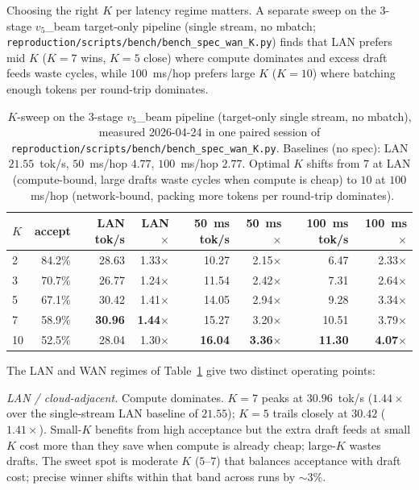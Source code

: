\documentclass[11pt]{article}
\newcommand{\brk}{\discretionary{}{}{}}
\begin{document}
Choosing the right $K$ per latency regime matters. A separate sweep on the 3-stage $v_5$\_beam target-only pipeline (single stream, no mbatch; \texttt{reproduction/\brk scripts/\brk bench/\brk bench\_\brk spec\_\brk wan\_\brk K.py}) finds that LAN prefers mid $K$ ($K\!=\!7$ wins, $K\!=\!5$ close) where compute dominates and excess draft feeds waste cycles, while $100$~ms/hop prefers large $K$ ($K\!=\!10$) where batching enough tokens per round-trip dominates.

\begin{table}[ht]
\centering
\caption{$K$-sweep on the 3-stage $v_5$\_beam pipeline (target-only single stream, no mbatch), measured 2026-04-24 in one paired session of \texttt{reproduction/\brk scripts/\brk bench/\brk bench\_\brk spec\_\brk wan\_\brk K.py}. Baselines (no spec): LAN $21.55$~tok/s, $50$~ms/hop $4.77$, $100$~ms/hop $2.77$. Optimal $K$ shifts from $7$ at LAN (compute-bound, large drafts waste cycles when compute is cheap) to $10$ at $100$~ms/hop (network-bound, packing more tokens per round-trip dominates).}
\label{tab:k_sweep}
\begin{tabular}{@{}lrrrrrrr@{}}
\toprule
$K$ & accept & LAN tok/s & LAN $\times$ & 50~ms tok/s & 50~ms $\times$ & 100~ms tok/s & 100~ms $\times$ \\
\midrule
2  & 84.2\% & 28.63 & 1.33$\times$ & 10.27 & 2.15$\times$ &  6.47 & 2.33$\times$ \\
3  & 70.7\% & 26.77 & 1.24$\times$ & 11.54 & 2.42$\times$ &  7.31 & 2.64$\times$ \\
5  & 67.1\% & 30.42 & 1.41$\times$ & 14.05 & 2.94$\times$ &  9.28 & 3.34$\times$ \\
7  & 58.9\% & \textbf{30.96} & \textbf{1.44$\times$} & 15.27 & 3.20$\times$ & 10.51 & 3.79$\times$ \\
10 & 52.5\% & 28.04 & 1.30$\times$ & \textbf{16.04} & \textbf{3.36$\times$} & \textbf{11.30} & \textbf{4.07$\times$} \\
\bottomrule
\end{tabular}
\end{table}

The LAN and WAN regimes of Table~\ref{tab:k_sweep} give two distinct operating points:

\textit{LAN / cloud-adjacent.} Compute dominates. $K\!=\!7$ peaks at $30.96$~tok/s ($1.44\times$ over the single-stream LAN baseline of $21.55$); $K\!=\!5$ trails closely at $30.42$ ($1.41\times$). Small-$K$ benefits from high acceptance but the extra draft feeds at small $K$ cost more than they save when compute is already cheap; large-$K$ wastes drafts. The sweet spot is moderate $K$ ($5$--$7$) that balances acceptance with draft cost; precise winner shifts within that band across runs by $\sim 3\%$.
\end{document}
